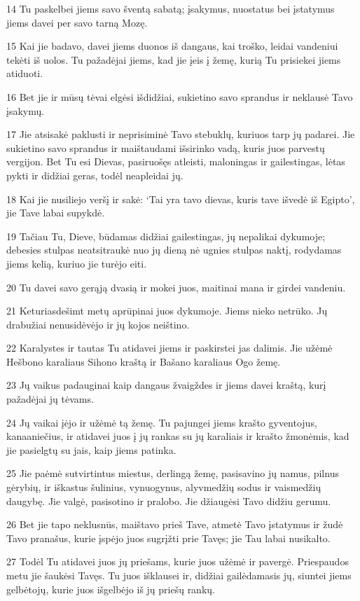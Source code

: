 \par 14 Tu paskelbei jiems savo šventą sabatą; įsakymus, nuostatus bei įstatymus jiems davei per savo tarną Mozę. 
\par 15 Kai jie badavo, davei jiems duonos iš dangaus, kai troško, leidai vandeniui tekėti iš uolos. Tu pažadėjai jiems, kad jie įeis į žemę, kurią Tu prisiekei jiems atiduoti. 
\par 16 Bet jie ir mūsų tėvai elgėsi išdidžiai, sukietino savo sprandus ir neklausė Tavo įsakymų. 
\par 17 Jie atsisakė paklusti ir neprisiminė Tavo stebuklų, kuriuos tarp jų padarei. Jie sukietino savo sprandus ir maištaudami išsirinko vadą, kuris juos parvestų vergijon. Bet Tu esi Dievas, pasiruošęs atleisti, maloningas ir gailestingas, lėtas pykti ir didžiai geras, todėl neapleidai jų. 
\par 18 Kai jie nusiliejo veršį ir sakė: ‘Tai yra tavo dievas, kuris tave išvedė iš Egipto’, jie Tave labai supykdė. 
\par 19 Tačiau Tu, Dieve, būdamas didžiai gailestingas, jų nepalikai dykumoje; debesies stulpas neatsitraukė nuo jų dieną nė ugnies stulpas naktį, rodydamas jiems kelią, kuriuo jie turėjo eiti. 
\par 20 Tu davei savo gerąją dvasią ir mokei juos, maitinai mana ir girdei vandeniu. 
\par 21 Keturiasdešimt metų aprūpinai juos dykumoje. Jiems nieko netrūko. Jų drabužiai nenusidėvėjo ir jų kojos neištino. 
\par 22 Karalystes ir tautas Tu atidavei jiems ir paskirstei jas dalimis. Jie užėmė Hešbono karaliaus Sihono kraštą ir Bašano karaliaus Ogo žemę. 
\par 23 Jų vaikus padauginai kaip dangaus žvaigždes ir jiems davei kraštą, kurį pažadėjai jų tėvams. 
\par 24 Jų vaikai įėjo ir užėmė tą žemę. Tu pajungei jiems krašto gyventojus, kanaaniečius, ir atidavei juos į jų rankas su jų karaliais ir krašto žmonėmis, kad jie pasielgtų su jais, kaip jiems patinka. 
\par 25 Jie paėmė sutvirtintus miestus, derlingą žemę, pasisavino jų namus, pilnus gėrybių, ir iškastus šulinius, vynuogynus, alyvmedžių sodus ir vaismedžių daugybę. Jie valgė, pasisotino ir pralobo. Jie džiaugėsi Tavo didžiu gerumu. 
\par 26 Bet jie tapo neklusnūs, maištavo prieš Tave, atmetė Tavo įstatymus ir žudė Tavo pranašus, kurie įspėjo juos sugrįžti prie Tavęs; jie Tau labai nusikalto. 
\par 27 Todėl Tu atidavei juos jų priešams, kurie juos užėmė ir pavergė. Priespaudos metu jie šaukėsi Tavęs. Tu juos išklausei ir, didžiai gailėdamasis jų, siuntei jiems gelbėtojų, kurie juos išgelbėjo iš jų priešų rankų. 
